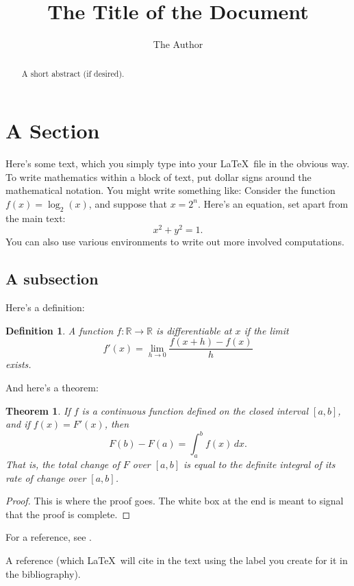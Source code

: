 \documentclass[12pt,a4paper,reqno,parskip=full]{amsart}
\numberwithin{equation}{section}
\theoremstyle{plain}
\newtheorem{theorem}[subsection]{Theorem}
\newtheorem{definition}[subsection]{Definition}
\theoremstyle{definition}
\def\R{{\mathbb R}}
\begin{document}
\title{The Title of the Document}

\author{The Author}

\maketitle

\begin{abstract}
A short abstract (if desired).
\end{abstract}

\section{A Section}

Here's some text, which you simply type into your \LaTeX\ file in the obvious way. To write mathematics within a block of text, put dollar signs around the mathematical notation. You might write something like: Consider the function $f(x)=\log_2(x)$, and suppose that $x=2^n$. Here's an equation, set apart from the main text:
\[
x^2+y^2=1.
\]
You can also use various environments to write out more involved computations.

\subsection{A subsection}

Here's a definition:

\begin{definition}
A function $f:\R\to\R$ is \emph{differentiable at $x$} if the limit
\[
f'(x)=\lim_{h\to 0}\frac{f(x+h)-f(x)}{h}
\]
exists.
\end{definition}

And here's a theorem:

\begin{theorem}
If $f$ is a continuous function defined on the closed interval $[a,b]$, and if $f(x)=F'(x)$, then
\[
F(b)-F(a)=\int_a^bf(x)\,dx.
\]
That is, the total change of $F$ over $[a,b]$ is equal to the definite integral of its rate of change over $[a,b]$.
\end{theorem}

\begin{proof}
This is where the proof goes. The white box at the end is meant to signal that the proof is complete.
\end{proof}

For a reference, see \cite{ref}.

\begin{thebibliography}{10}

 A reference (which \LaTeX\ will cite in the text using the label you create for it in the bibliography).

\end{thebibliography}
\end{document}

